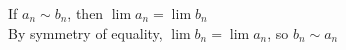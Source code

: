 \documentclass[preview]{standalone}
\begin{document}
\begin{center}
If $a_n \sim b_n$, then $\lim a_n = \lim b_n$\\By symmetry of equality, $\lim b_n = \lim a_n$, so $b_n \sim a_n$
\end{center}
\end{document}
